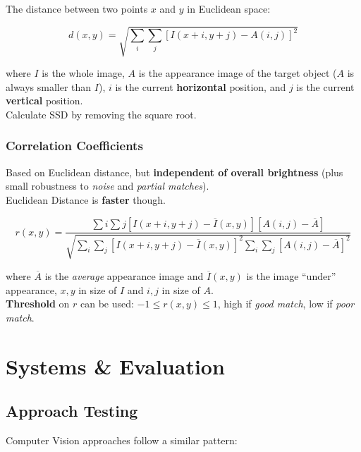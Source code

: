 \documentclass[english, 10pt]{article}
\begin{document}
The distance between two points $x$ and $y$ in Euclidean space:

$$ d(x, y) = \sqrt{\sum_{i}\sum_{j}[I(x + i, y + j) - A(i, j)]^2}$$

where $I$ is the whole image, $A$ is the appearance image of the target object ($A$ is always smaller than $I$), $i$ is the current \textbf{horizontal} position, and $j$ is the 
current \textbf{vertical} position. \\


Calculate SSD by removing the square root.

\subsubsection{Correlation Coefficients}

Based on Euclidean distance, but \textbf{independent of overall brightness} (plus small robustness to \textit{noise} and \textit{partial matches}). \\

Euclidean Distance is \textbf{faster} though.

$$ r(x, y) = \frac{\sum{i}\sum{j}[I(x + i, y + j) - \overline{I}(x, y)][A(i, j) - \overline{A}]}{\sqrt{\sum_{i}\sum_{j}[I(x + i, y + j) - \overline{I}(x, y)]^2\sum_{i}\sum_{j}[A(i, j) - \overline{A}]^2}}$$

where $\overline{A}$ is the \textit{average} appearance image and $\overline{I}(x, y)$ is the image ``under'' appearance, $x, y$ in size of $I$ and $i, j$ in size of $A$. \\

\textbf{Threshold} on $r$ can be used: $-1 \leq r(x, y) \leq 1$, high if \textit{good match}, low if \textit{poor match}.

\section{Systems \& Evaluation}

\subsection{Approach Testing}

Computer Vision approaches follow a similar pattern:
\end{document}
